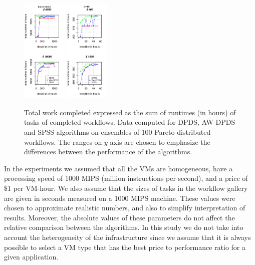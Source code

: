 \documentclass{sig-alternate}
\begin{document}
\begin{figure}[t]
\includegraphics[width=0.19\textwidth]{figures/pareto-size-GENOME-n-1000-8-dagh100-1500m0.pdf}
\includegraphics[width=0.19\textwidth]{figures/pareto-size-SIPHT-n-1000-8-dagh5-50m0.pdf}
\caption{ Total work completed expressed as the sum of runtimes (in hours) of
tasks of completed workflows. Data computed for DPDS, AW-DPDS and SPSS
algorithms on ensembles of 100 Pareto-distributed workflows. The ranges on $y$ axis are chosen to 
emphasize the differences between the performance of the algorithms.}
\label{fig:total-time}
\end{figure}

In the experiments we assumed that all the VMs are homogeneous, have a
processing speed of 1000 MIPS (million instructions per second), and a price of
\$1 per VM-hour. We also assume that the sizes of tasks in the workflow gallery
are given in seconds measured on a 1000 MIPS machine. These values were chosen
to approximate realistic numbers, and also to simplify interpretation of
results. Moreover, the absolute values of these parameters do not affect the
relative comparison between the algorithms. In this study we do not take into
account the heterogeneity of the infrastructure since we assume that it is
always possible to select a VM type that has the best price to performance ratio
for a given application.
\end{document}
